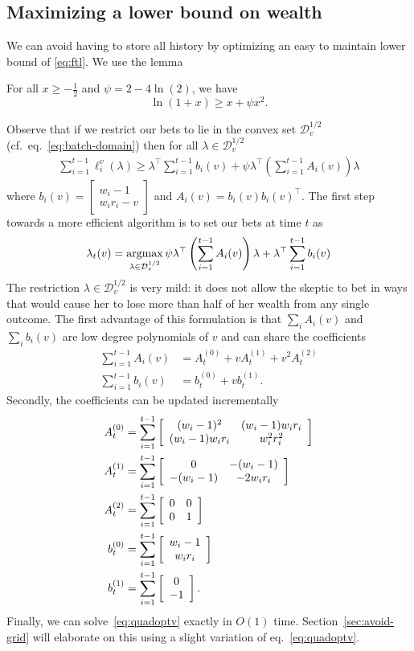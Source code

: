 \subsection{Maximizing a lower bound on wealth}

We can avoid having to store all history by optimizing an easy to maintain
lower bound of \eqref{eq:ftl}.  We use the lemma
\begin{lemma} 
\label{lem:quadbound}
For all $x\geq -\frac{1}{2}$ and $\psi=2-4\ln(2)$, we have
\[
\ln(1+x)\geq x + \psi x^2.
\]
\end{lemma}
Observe that if we restrict our bets to lie in the convex set
$\mathcal{D}_v^{1/2}$ (cf.~eq.~\eqref{eq:batch-domain}) then for all $\lambda
\in \mathcal{D}_v^{1/2}$
\begin{align*}
\sum_{i=1}^{t-1} \ell_i^v(\lambda) 
\geq
\lambda^\top \sum_{i=1}^{t-1} b_i(v) 
+\psi \lambda^\top \left(\sum_{i=1}^{t-1} A_i(v)\right) \lambda
\end{align*}
where 
$b_i(v)=
\left[\begin{array}{c} 
w_i-1 \\ w_i r_i -v 
\end{array}\right] 
$
and 
$
A_i(v) = b_i(v)b_i(v)^\top.
$
The first step towards a more efficient algorithm is to set our bets at time
$t$ as
\begin{equation}
\lambda_t(v) = \operatorname*{argmax}_{\lambda \in \mathcal{D}_{v}^{1/2}}
\psi  \lambda^\top \left(\sum_{i=1}^{t-1} A_i(v)\right) \lambda 
+ \lambda^\top \sum_{i=1}^{t-1} b_i(v)
\label{eq:quadoptv}
\end{equation}
The restriction $\lambda \in \mathcal{D}_{v}^{1/2}$ is very mild: it does not
allow the skeptic to bet in ways that would cause her to lose more than half of
her wealth from any single outcome.  The first advantage of this formulation is
that $\sum_i A_i(v)$ and $\sum_i b_i(v)$ are low degree polynomials of $v$ and
can share the coefficients
    \begin{align*}
        \sum_{i=1}^{t-1} A_i(v) &= 
        A_t^{(0)} + v A_t^{(1)} + v^2 A_t^{(2)}\\   
        \sum_{i=1}^{t-1} b_i(v) &= b_t^{(0)} + v b_t^{(1)}.  
    \end{align*}
Secondly, the coefficients can be updated incrementally
    \begin{align}
        A_t^{(0)} &=\sum_{i=1}^{t-1}\left[\begin{array}{cc} (w_i-1)^2 & (w_i-1)w_i r_i \\ (w_i-1)w_i r_i & w_i^2r_i^2 \end{array}\right] \label{eq:upsuffa0}\\
        A_t^{(1)} &= \sum_{i=1}^{t-1} \left[\begin{array}{cc} 0 & -(w_i-1) \\ -(w_i-1) & -2w_ir_i \end{array}\right]\\
        A_t^{(2)} &=\sum_{i=1}^{t-1}  \left[\begin{array}{cc} 0 & 0 \\ 0 & 1 \end{array}\right]\\
        b_t^{(0)} &=\sum_{i=1}^{t-1}  \left[\begin{array}{c} w_i-1 \\ w_ir_i \end{array}\right]\\
        b_t^{(1)} &=\sum_{i=1}^{t-1}  \left[\begin{array}{c} 0 \\ -1 \end{array}\right]. \label{eq:upsuffb1}
    \end{align}
Finally, we can solve~\eqref{eq:quadoptv} exactly in $O(1)$ time.
Section~\ref{sec:avoid-grid} will elaborate on this using a slight variation of
eq.~\eqref{eq:quadoptv}.

